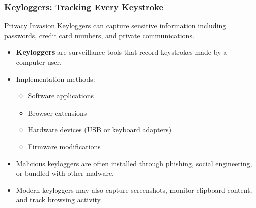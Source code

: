 \documentclass{beamer}
\begin{document}
\begin{frame}
    \frametitle{Keyloggers: Tracking Every Keystroke}
    
    \begin{alertblock}{Privacy Invasion}
        Keyloggers can capture sensitive information including passwords, credit card numbers, and private communications.
    \end{alertblock}
    
    \begin{itemize}
        \item \textbf{Keyloggers} are surveillance tools that record keystrokes made by a computer user.
        \item Implementation methods:
            \begin{itemize}
                \item Software applications
                \item Browser extensions
                \item Hardware devices (USB or keyboard adapters)
                \item Firmware modifications
            \end{itemize}
        \item Malicious keyloggers are often installed through phishing, social engineering, or bundled with other malware.
        \item Modern keyloggers may also capture screenshots, monitor clipboard content, and track browsing activity.
    \end{itemize}
\end{frame}
\end{document}
